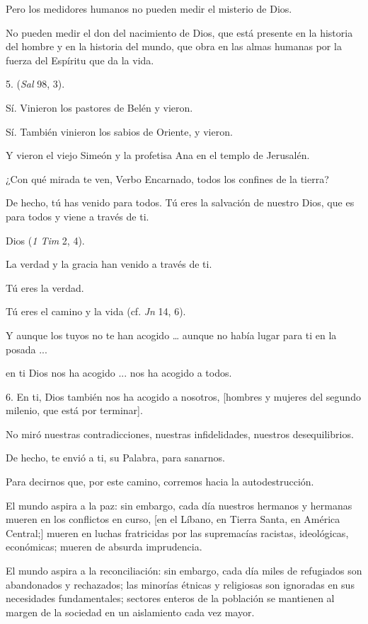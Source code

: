 \begin{body}
\begin{body}
		Pero los medidores humanos no pueden medir el misterio de Dios.
		
		No pueden medir el don del nacimiento de Dios, que está presente en la historia del hombre y en la historia del mundo, que obra en las almas humanas por la fuerza del Espíritu que da la vida.
		
		5.  (\emph{Sal} 98, 3).
		
		Sí. Vinieron los pastores de Belén y vieron.
		
		Sí. También vinieron los sabios de Oriente, y vieron.
		
		Y vieron el viejo Simeón y la profetisa Ana en el templo de Jerusalén.
		
		¿Con qué mirada te ven, Verbo Encarnado, todos los confines de la tierra?
		
		De hecho, tú has venido para todos. Tú eres la salvación de nuestro Dios, que es para todos y viene a través de ti.
		
		Dios  (\emph{1 Tim} 2, 4).
		
		La verdad y la gracia han venido a través de ti.
		
		Tú eres la verdad.
		
		Tú eres el camino y la vida (cf. \emph{Jn} 14, 6).
		
		Y aunque los tuyos no te han acogido \ldots{} aunque no había lugar para ti en la posada ...
		
		en ti Dios nos ha acogido ... nos ha acogido a todos.
		
		6. En ti, Dios también nos ha acogido a nosotros, {[}hombres y mujeres del segundo milenio, que está por terminar{]}.
		
		No miró nuestras contradicciones, nuestras infidelidades, nuestros desequilibrios.
		
		De hecho, te envió a ti, su Palabra, para sanarnos.
		
		Para decirnos que, por este camino, corremos hacia la autodestrucción.
		
		El mundo aspira a la paz: sin embargo, cada día nuestros hermanos y hermanas mueren en los conflictos en curso, {[}en el Líbano, en Tierra Santa, en América Central;{]} mueren en luchas fratricidas por las supremacías racistas, ideológicas, económicas; mueren de absurda imprudencia.
		
		El mundo aspira a la reconciliación: sin embargo, cada día miles de refugiados son abandonados y rechazados; las minorías étnicas y religiosas son ignoradas en sus necesidades fundamentales; sectores enteros de la población se mantienen al margen de la sociedad en un aislamiento cada vez mayor.
		

\end{body}
\end{body}
